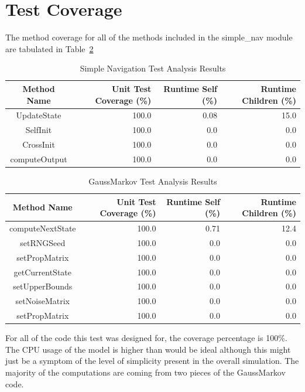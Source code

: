 \documentclass[]{LASPreport}
\begin{document}
\section{Test Coverage}
The method coverage for all of the methods included in the simple\_nav 
module are tabulated in Table~\ref{tab:cov_met}

\begin{table}[htbp]
    \caption{Simple Navigation Test Analysis Results}
   \label{tab:cov_met}
        \centering \fontsize{10}{10}\selectfont
   \begin{tabular}{c | r | r | r} %
      \hline
      Method Name    & Unit Test Coverage (\%) & Runtime Self (\%) & Runtime Children (\%) \\
      \hline
      UpdateState & 100.0 & 0.08 & 15.0 \\
      SelfInit & 100.0 & 0.0 & 0.0 \\
      CrossInit & 100.0 & 0.0 & 0.0 \\
      computeOutput & 100.0 & 0.0 & 0.0 \\
      \hline
   \end{tabular}
\end{table}

\begin{table}[htbp]
    \caption{GaussMarkov Test Analysis Results}
   \label{tab:cov_met}
        \centering \fontsize{10}{10}\selectfont
   \begin{tabular}{c | r | r | r} %
      \hline
      Method Name    & Unit Test Coverage (\%) & Runtime Self (\%) & Runtime Children (\%) \\
      \hline
      computeNextState & 100.0 & 0.71 & 12.4 \\
      setRNGSeed & 100.0 & 0.0 & 0.0 \\
      setPropMatrix & 100.0 & 0.0 & 0.0 \\
      getCurrentState & 100.0 & 0.0 & 0.0 \\
      setUpperBounds & 100.0 & 0.0 & 0.0 \\
      setNoiseMatrix & 100.0 & 0.0 & 0.0 \\
      setPropMatrix & 100.0 & 0.0 & 0.0 \\
      \hline
   \end{tabular}
\end{table}
For all of the code this test was designed for, the coverage percentage is 
100\%.  The CPU usage of the model is higher than would be ideal although this 
might just be a symptom of the level of simplicity present in the overall 
simulation.  The majority of the computations are coming from two pieces of the 
GaussMarkov code.  
\end{document}
